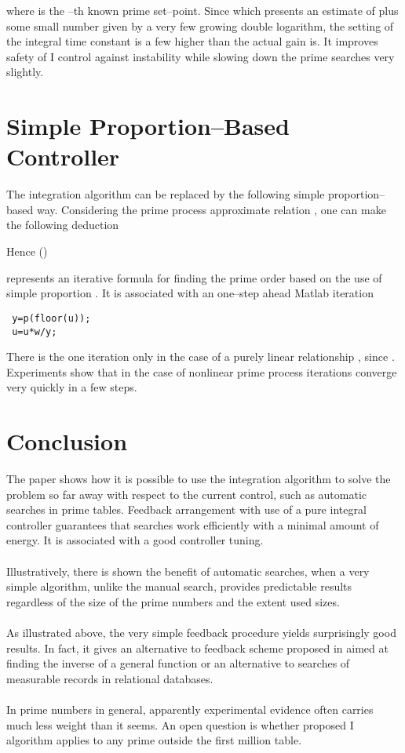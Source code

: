 \documentclass[12pt,a4paper,twoside]{article}
\begin{document}
 
where  is the --th known prime set--point. Since  which presents an estimate of  plus some small number given by a very few growing double logarithm, the setting of the integral time constant is a few higher than the actual gain is. It improves safety of I control against instability while slowing down the prime searches very slightly.

\section{Simple Proportion--Based Controller}

\vspace{0.3cm}\noindent The integration algorithm  can be replaced by the following simple proportion--based way. Considering the prime process approximate relation , one can make the following deduction 


Hence ()


represents an iterative formula for finding the prime order based on the use of simple proportion . It is associated with an one--step ahead Matlab iteration 

 \begin{verbatim}
 y=p(floor(u));
 u=u*w/y;
 \end{verbatim} 
There is the one iteration only in the case of a purely linear relationship , since . Experiments show that in the case of nonlinear prime process iterations converge very quickly in a few steps.

\section{Conclusion}

\vspace{0.3cm}\noindent The paper shows how it is possible to use the integration algorithm to solve the problem so far away with respect to the current control, such as automatic searches in prime tables. Feedback arrangement with use of a pure integral controller guarantees that searches work efficiently with a minimal amount of energy. It is associated with a good controller tuning. \\
\\
Illustratively, there is shown the benefit of automatic searches, when a very simple algorithm, unlike the manual search, provides predictable results regardless of the size of the prime numbers and the extent used sizes.\\
\\
As illustrated above, the very simple feedback procedure yields surprisingly good results. In fact, it gives an alternative to feedback scheme proposed in \cite{ggs} aimed at finding the inverse of a general function or an alternative to searches of measurable records in relational databases.\\
\\  
In prime numbers in general, apparently experimental evidence often carries much less weight than it seems. An open question is whether proposed I algorithm applies to any prime outside the first  million table.
\end{document}

